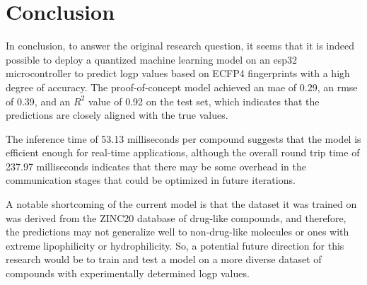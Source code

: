 \chapter{Conclusion}

In conclusion, to answer the original research question, it seems that it is indeed possible to deploy a quantized machine learning model on an \gls{esp32} microcontroller to predict \gls{logp} values based on ECFP4 fingerprints with a high degree of accuracy.
The proof-of-concept model achieved an \acrshort{mae} of 0.29, an \acrshort{rmse} of 0.39, and an $R^2$ value of 0.92 on the test set, which indicates that the predictions are closely aligned with the true values.

The inference time of 53.13 milliseconds per compound suggests that the model is efficient enough for real-time applications, although the overall round trip time of 237.97 milliseconds indicates that there may be some overhead in the communication stages that could be optimized in future iterations.

A notable shortcoming of the current model is that the dataset it was trained on was derived from the \gls{ZINC20} database of drug-like compounds, 
and therefore, the predictions may not generalize well to non-drug-like molecules or ones with extreme \gls{lipophilicity} or \gls{hydrophilicity}.
So, a potential future direction for this research would be to train and test a model on a more diverse dataset of compounds with experimentally determined \gls{logp} values.